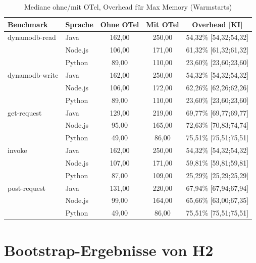 \begin{table}[H]
\centering
\footnotesize
\caption{Mediane ohne/mit OTel, Overhead  für Max Memory (Warmstarts)}
\label{app:boot-abs-memory-hot}
\begin{tabular}{|l|l|c|c|c|}
\hline
\textbf{Benchmark} & \textbf{Sprache} & \textbf{Ohne OTel} & \textbf{Mit OTel} & \textbf{Overhead [KI]} \\
\hline
dynamodb-read   & Java    & 162,00 & 250,00 & 54,32\% [54,32;54,32] \\
                & Node.js & 106,00 & 171,00 & 61,32\% [61,32;61,32] \\
                & Python  &  89,00 & 110,00 & 23,60\% [23,60;23,60] \\
\hline
dynamodb-write  & Java    & 162,00 & 250,00 & 54,32\% [54,32;54,32] \\
                & Node.js & 106,00 & 172,00 & 62,26\% [62,26;62,26] \\
                & Python  &  89,00 & 110,00 & 23,60\% [23,60;23,60] \\
\hline
get-request     & Java    & 129,00 & 219,00 & 69,77\% [69,77;69,77] \\
                & Node.js &  95,00 & 165,00 & 72,63\% [70,83;74,74] \\
                & Python  &  49,00 &  86,00 & 75,51\% [75,51;75,51] \\
\hline
invoke          & Java    & 162,00 & 250,00 & 54,32\% [54,32;54,32] \\
                & Node.js & 107,00 & 171,00 & 59,81\% [59,81;59,81] \\
                & Python  &  87,00 & 109,00 & 25,29\% [25,29;25,29] \\
\hline
post-request    & Java    & 131,00 & 220,00 & 67,94\% [67,94;67,94] \\
                & Node.js &  99,00 & 164,00 & 65,66\% [63,00;67,35] \\
                & Python  &  49,00 &  86,00 & 75,51\% [75,51;75,51] \\
\hline
\end{tabular}
\end{table}

\section{Bootstrap-Ergebnisse von H2}
